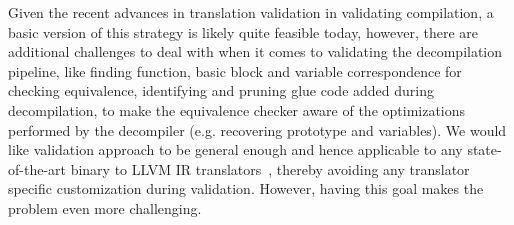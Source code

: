 Given the recent advances in translation validation in validating compilation,
      a basic version of this strategy is likely quite feasible today, however,
      there are additional challenges to deal with when it comes to validating
      the decompilation pipeline, like finding function, basic block and
          variable correspondence for checking equivalence, identifying and
          pruning glue code added during decompilation, to make the equivalence
          checker aware of the optimizations performed by the decompiler (e.g. 
          recovering prototype and variables). We would like validation approach
          to be  general enough and hence applicable to any state-of-the-art
          binary to LLVM IR
          translators~\cite{McSema:Recon14,Remill,FCD,reopt,llvm-mctoll},
          thereby avoiding any translator specific customization during
          validation.  However, having this goal makes the problem even more
          challenging.
      
      
